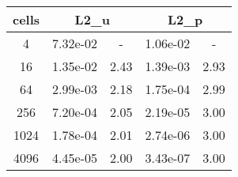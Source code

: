 \documentclass[10pt]{report}
\begin{document}
\begin{table}[H]
\begin{center}
\begin{tabular}{|c|c|c|c|c|} \hline
cells & 
\multicolumn{2}{|c|}{L2_u} & 
\multicolumn{2}{|c|}{L2_p}\\ \hline
4 & 7.32e-02 & - & 1.06e-02 & -\\ \hline
16 & 1.35e-02 & 2.43 & 1.39e-03 & 2.93\\ \hline
64 & 2.99e-03 & 2.18 & 1.75e-04 & 2.99\\ \hline
256 & 7.20e-04 & 2.05 & 2.19e-05 & 3.00\\ \hline
1024 & 1.78e-04 & 2.01 & 2.74e-06 & 3.00\\ \hline
4096 & 4.45e-05 & 2.00 & 3.43e-07 & 3.00\\ \hline
\end{tabular}
\end{center}
\end{table}
\end{document}

